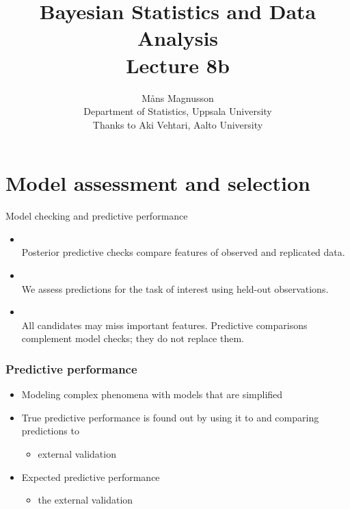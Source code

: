 \documentclass[10pt]{beamer}
\title[]{{\color{black}Bayesian Statistics and Data Analysis \\ Lecture 8b}}
\author[]{M{\aa}ns Magnusson \\ Department of Statistics, Uppsala University \\ Thanks to Aki Vehtari, Aalto University}
\date{}
\begin{document}
\frame{\titlepage
}



\section{Model assessment and selection}
\frame{\sectionpage}

\begin{frame}{Model checking and predictive performance}

  \begin{itemize}
  \item<1-> \\
    Posterior predictive checks compare features of observed and replicated data.
  \item<2-> \\
    We assess predictions for the task of interest using held-out observations.
  \item<3-> \\
    All candidates may miss important features. Predictive comparisons
    complement model checks; they do not replace them.
  \end{itemize}

\end{frame}


\begin{frame}
\frametitle{Predictive performance}

\begin{itemize}
   \item<1-> Modeling complex phenomena with models that are simplified\\
  \item<2-> True predictive performance is found out by using it to  and comparing predictions to 
    \begin{itemize}
      \item external validation
    \end{itemize}
  \item<3-> Expected predictive performance
    \begin{itemize}
      \item {} the external validation
    \end{itemize}
\end{itemize}

\end{frame}
\end{document}
